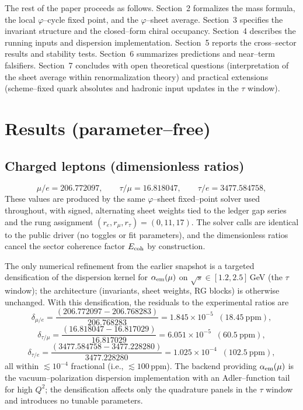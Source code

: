 \documentclass[11pt]{article}
\begin{document}
The rest of the paper proceeds as follows. Section~2 formalizes the mass formula, the local $\varphi$--cycle fixed point, and the $\varphi$--sheet average. Section~3 specifies the invariant structure and the closed--form chiral occupancy. Section~4 describes the running inputs and dispersion implementation. Section~5 reports the cross--sector results and stability tests. Section~6 summarizes predictions and near--term falsifiers. Section~7 concludes with open theoretical questions (interpretation of the sheet average within renormalization theory) and practical extensions (scheme--fixed quark absolutes and hadronic input updates in the $\tau$ window).

\section{Results (parameter--free)}
\subsection{Charged leptons (dimensionless ratios)}
\[
\mu/e=206.772097,\qquad \tau/\mu=16.818047,\qquad \tau/e=3477.584758,
\]
These values are produced by the same $\varphi$--sheet fixed--point solver used throughout, with signed, alternating sheet weights tied to the ledger gap series and the rung assignment $(r_e,r_\mu,r_\tau)=(0,11,17)$. The solver calls are identical to the public driver (no toggles or fit parameters), and the dimensionless ratios cancel the sector coherence factor $E_{\rm coh}$ by construction.

The only numerical refinement from the earlier snapshot is a targeted densification of the dispersion kernel for $\alpha_{\rm em}(\mu)$ on $\sqrt{s}\!\in[1.2,2.5]\,$GeV (the $\tau$ window); the architecture (invariants, sheet weights, RG blocks) is otherwise unchanged. With this densification, the residuals to the experimental ratios are
\[
\delta_{\mu/e}=\frac{(206.772097-206.768283)}{206.768283}=1.845\times 10^{-5}\;\;(18.45~\mathrm{ppm}),
\]
\[
\delta_{\tau/\mu}=\frac{(16.818047-16.817029)}{16.817029}=6.051\times 10^{-5}\;\;(60.5~\mathrm{ppm}),
\]
\[
\delta_{\tau/e}=\frac{(3477.584758-3477.228280)}{3477.228280}=1.025\times 10^{-4}\;\;(102.5~\mathrm{ppm}),
\]
 all within $\lesssim 10^{-4}$ fractional (i.e., $\lesssim 100$\,ppm). The backend providing $\alpha_{\rm em}(\mu)$ is the vacuum–polarization dispersion implementation with an Adler–function tail for high $Q^2$; the densification affects only the quadrature panels in the $\tau$ window and introduces no tunable parameters.
\end{document}

